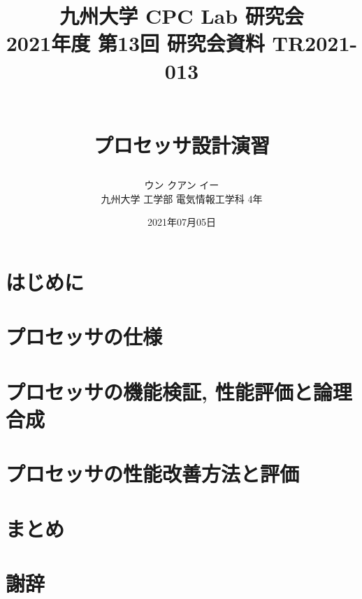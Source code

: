 \documentclass[a4paper, 10pt]{jarticle}
\title{
  \begin{flushright}
    \normalsize{
      九州大学 CPC Lab 研究会  \\
      2021年度 第13回 研究会資料 TR2021-013
    }
  \end{flushright}
  \Large{\textbf{\\プロセッサ設計演習}}
}
\author{
    ウン クアン イー\\
    九州大学 工学部 電気情報工学科 4年
}
\date{2021年07月05日}
\begin{document}
  \begin{twocolumn}

  \maketitle

  \section{はじめに} \label{section:introduction}
  

  \section{プロセッサの仕様} \label{section:specifications}
  

  \section{プロセッサの機能検証, 性能評価と論理合成} \label{section:evaluation}
  

  \section{プロセッサの性能改善方法と評価} \label{section:improvements}
  

  \section{まとめ} \label{section:summary}
  

  \section*{謝辞}
  

  
  

  \begin{appendices} \label{section:appendix}
    
  \end{appendices}

\end{twocolumn}
\end{document}
